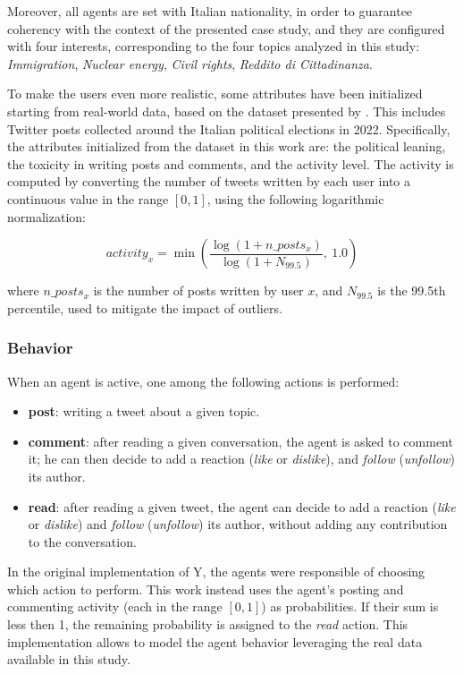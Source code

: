 Moreover, all agents are set with Italian nationality, in order to guarantee coherency with the context of the presented case study, and they are configured with four interests, corresponding to the four topics analyzed in this study: \textit{Immigration}, \textit{Nuclear energy}, \textit{Civil rights}, \textit{Reddito di Cittadinanza}.

\medskip
To make the users even more realistic, some attributes have been initialized starting from real-world data, based on the dataset presented by \citet{pierri2023ita}. This includes Twitter posts collected around the Italian political elections in 2022.
Specifically, the attributes initialized from the dataset in this work are: the political leaning, the toxicity in writing posts and comments, and the activity level.
The activity is computed by converting the number of tweets written by each user into a continuous value in the range $[0,1]$, using the following logarithmic normalization:

\[
activity_x = \min\left( \frac{\log(1 + n\_posts_x)}{\log(1 + N_{99.5})},\ 1.0 \right)
\]

where $n\_posts_x$ is the number of posts written by user $x$, and $N_{99.5}$ is the 99.5th percentile, used to mitigate the impact of outliers.


\subsubsection{Behavior}
When an agent is active, one among the following actions is performed:
\begin{itemize}
    \item \textbf{post}: writing a tweet about a given topic.
    \item \textbf{comment}: after reading a given conversation, the agent is asked to comment it; he can then decide to add a reaction (\textit{like} or \textit{dislike}), and \textit{follow} (\textit{unfollow}) its author.
    \item \textbf{read}: after reading a given tweet, the agent can decide to add a reaction (\textit{like} or \textit{dislike}) and \textit{follow} (\textit{unfollow}) its author, without adding any contribution to the conversation.
\end{itemize}

\medskip
In the original implementation of Y, the agents were responsible of choosing which action to perform.
This work instead uses the agent's posting and commenting activity (each in the range $[0,1]$) as probabilities. If their sum is less then 1, the remaining probability is assigned to the \textit{read} action.
This implementation allows to model the agent behavior leveraging the real data available in this study.

